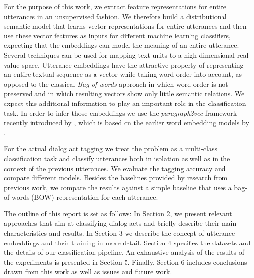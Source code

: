 For the purpose of this work, we extract feature representations for entire utterances in an unsupervised fashion.
We therefore build a distributional semantic model that learns vector representations for entire utterances and then use these vector features as inputs for different machine learning classifiers, expecting that the embeddings can model the meaning of an entire utterance.
Several techniques can be used for mapping text units to a high dimensional real value space.
Utterance embeddings have the attractive property of representing an entire textual sequence as a vector while taking word order into account, as opposed to the classical \emph{Bag-of-words} approach in which word order is not preserved and in which resulting vectors show only little semantic relations.
We expect this additional information to play an important role in the classification task. In order to infer those embeddings we use the \emph{paragraph2vec} framework recently introduced by \cite{le2014distributed}, which is based on the earlier word embedding models by \cite{mikolov2013efficient}.

For the actual dialog act tagging we treat the problem as a multi-class classification task and classify utterances both in isolation as well as in the context of the previous utterances.
We evaluate the tagging accuracy and compare different models.
Besides the baselines provided by research from previous work, we compare the results against a simple baseline that uses a bag-of-words (BOW) representation for each utterance. 

The outline of this report is set as follows: In Section 2, we present relevant approaches that aim at classifying dialog acts and briefly describe their main characteristics and results. In Section 3 we describe the concept of utterance embeddings and their training in more detail. Section 4 specifies the datasets and the details of our classification pipeline. An exhaustive analysis of the results of the experiments is presented in Section 5. Finally, Section 6 includes conclusions drawn from this work as well as issues and future work. 
